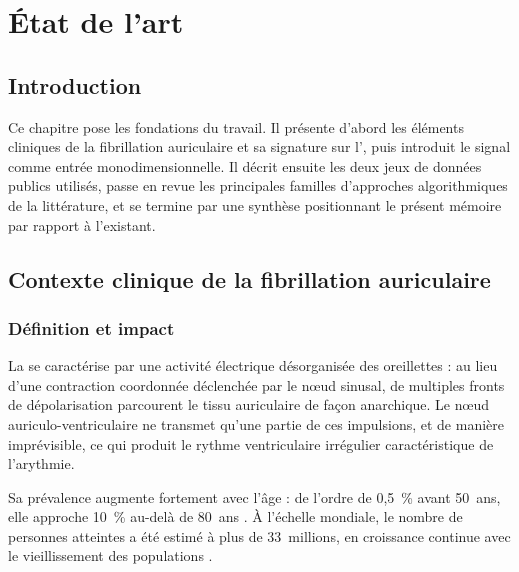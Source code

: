 \chapter{État de l'art}
\label{ch:soa}

\section{Introduction}
\label{sec:soa:intro}
Ce chapitre pose les fondations du travail. Il présente d'abord les éléments cliniques de la fibrillation auriculaire et sa signature sur l'\ECG{}, puis introduit le signal \RR{} comme entrée monodimensionnelle. Il décrit ensuite les deux jeux de données publics utilisés, passe en revue les principales familles d'approches algorithmiques de la littérature, et se termine par une synthèse positionnant le présent mémoire par rapport à l'existant.

\section{Contexte clinique de la fibrillation auriculaire}
\label{sec:soa:clinique}

\subsection{Définition et impact}
La \FA{} se caractérise par une activité électrique désorganisée des oreillettes : au lieu d'une contraction coordonnée déclenchée par le n{\oe}ud sinusal, de multiples fronts de dépolarisation parcourent le tissu auriculaire de façon anarchique. Le n{\oe}ud auriculo-ventriculaire ne transmet qu'une partie de ces impulsions, et de manière imprévisible, ce qui produit le rythme ventriculaire irrégulier caractéristique de l'arythmie.

Sa prévalence augmente fortement avec l'âge : de l'ordre de 0,5~\% avant 50~ans, elle approche 10~\% au-delà de 80~ans \cite{hindricks2021guidelines}. À l'échelle mondiale, le nombre de personnes atteintes a été estimé à plus de 33~millions, en croissance continue avec le vieillissement des populations \cite{chugh2014worldwide}.

